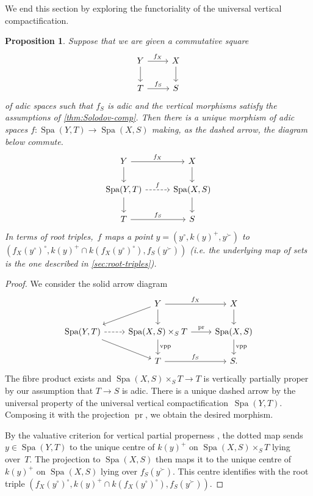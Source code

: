 \documentclass[a4paper,twoside,11pt,reqno]{amsart}
\DeclareMathOperator{\pr}{pr}
\DeclareMathOperator{\Spa}{Spa}
\newtheorem{prop}[thm]{Proposition}
\theoremstyle{definition}
\numberwithin{equation}{subsection}
\begin{document}
We end this section by exploring the functoriality of the universal vertical compactification.

\begin{prop} \label{prop:Spa-functoriality}
Suppose that we are given a commutative square
\[
 \begin{tikzcd}
     Y     \ar[r,"f_X"]   \ar[d]  & X   \ar[d]  \\
     T      \ar[r,"f_S"]          & S
 \end{tikzcd}
\]
of adic spaces such that $f_S$ is adic and the vertical morphisms satisfy the assumptions of \cref{thm:Solodov-comp}.
Then there is a unique morphism of adic spaces $f \colon \Spa(Y,T) \to \Spa(X,S)$ making, as the dashed arrow, the diagram below commute.
\[
 \begin{tikzcd}[column sep= 1cm]
     Y          \ar[r,"f_X"]   \ar[d]  & X   \ar[d]  \\
     \Spa(Y,T)  \ar[r,dashed,"f"] \ar[d] & \Spa(X,S) \ar[d] \\
     T          \ar[r,"f_S"]          & S
 \end{tikzcd}
\]
In terms of root triples,~$f$ maps a point $y = (y^\circ,k(y)^+,y^\succ)$ to $(f_X(y^\circ)^\circ,k(y)^+ \cap k(f_X(y^\circ)^\circ),f_S(y^\succ))$ (i.e. the underlying map of sets is the one described in \cref{sec:root-triples}).
\end{prop}

\begin{proof}
    We consider the solid arrow diagram
    \[
    \begin{tikzcd}
    & Y \ar[dl] \ar[d] \ar[r,"f_X"] & X \ar[d] \\
    \Spa(Y,T) \ar[r,dashed] \ar[dr] & \Spa(X,S) \times_S T \ar[r,"\pr"] \ar[d,"\rm vpp"] & \Spa(X,S) \ar[d,"\rm vpp"] \\
    & T \ar[r,"f_S"] & S.
    \end{tikzcd}
    \]
    The fibre product exists and $\Spa(X,S) \times_S T \to T$ is vertically partially proper by our assumption that $T \to S$ is adic.
    There is a unique dashed arrow by the universal property of the universal vertical compactification~$\Spa(Y,T)$.
    Composing it with the projection $\pr$,
    we obtain the desired morphism.
    
    By the valuative criterion for vertical partial properness \cite{Bauer:valuative-criteria}, the dotted map sends $y \in \Spa(Y,T)$ to the unique centre of $k(y)^+$ on $\Spa(X,S) \times_S T$ lying over~$T$.
    The projection to $\Spa(X,S)$ then maps it to the unique centre of $k(y)^+$ on $\Spa(X,S)$ lying over $f_S(y^\succ)$.
    This centre identifies with the root triple $(f_X(y^\circ)^\circ,k(y)^+ \cap k(f_X(y^\circ)^\circ),f_S(y^\succ))$.
\end{proof}
\end{document}
